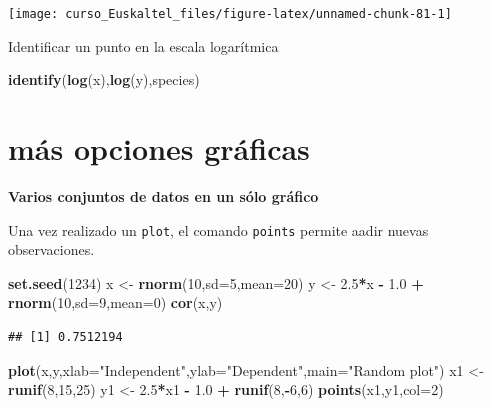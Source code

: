 \documentclass[]{book}
\newenvironment{Shaded}{\begin{snugshade}}{\end{snugshade}}
\newcommand{\KeywordTok}[1]{\textcolor[rgb]{0.13,0.29,0.53}{\textbf{#1}}}
\newcommand{\DataTypeTok}[1]{\textcolor[rgb]{0.13,0.29,0.53}{#1}}
\newcommand{\DecValTok}[1]{\textcolor[rgb]{0.00,0.00,0.81}{#1}}
\newcommand{\FloatTok}[1]{\textcolor[rgb]{0.00,0.00,0.81}{#1}}
\newcommand{\StringTok}[1]{\textcolor[rgb]{0.31,0.60,0.02}{#1}}
\newcommand{\OperatorTok}[1]{\textcolor[rgb]{0.81,0.36,0.00}{\textbf{#1}}}
\newcommand{\NormalTok}[1]{#1}
\begin{document}
\begin{center}\texttt{[image: curso\_Euskaltel\_files/figure-latex/unnamed-chunk-81-1]} \end{center}

Identificar un punto en la escala logarítmica

\begin{Shaded}
\begin{Highlighting}[]
\KeywordTok{identify}\NormalTok{(}\KeywordTok{log}\NormalTok{(x),}\KeywordTok{log}\NormalTok{(y),species)}
\end{Highlighting}
\end{Shaded}

\section{más opciones gráficas}\label{mas-opciones-graficas}

\textbf{Varios conjuntos de datos en un sólo gráfico}

Una vez realizado un \texttt{plot}, el comando \texttt{points} permite
aadir nuevas observaciones.

\begin{Shaded}
\begin{Highlighting}[]
\KeywordTok{set.seed}\NormalTok{(}\DecValTok{1234}\NormalTok{)}
\NormalTok{ x <-}\StringTok{ }\KeywordTok{rnorm}\NormalTok{(}\DecValTok{10}\NormalTok{,}\DataTypeTok{sd=}\DecValTok{5}\NormalTok{,}\DataTypeTok{mean=}\DecValTok{20}\NormalTok{)}
\NormalTok{ y <-}\StringTok{ }\FloatTok{2.5}\OperatorTok{*}\NormalTok{x }\OperatorTok{-}\StringTok{ }\FloatTok{1.0} \OperatorTok{+}\StringTok{ }\KeywordTok{rnorm}\NormalTok{(}\DecValTok{10}\NormalTok{,}\DataTypeTok{sd=}\DecValTok{9}\NormalTok{,}\DataTypeTok{mean=}\DecValTok{0}\NormalTok{)}
 \KeywordTok{cor}\NormalTok{(x,y)}
\end{Highlighting}
\end{Shaded}

\begin{verbatim}
## [1] 0.7512194
\end{verbatim}

\begin{Shaded}
\begin{Highlighting}[]
 \KeywordTok{plot}\NormalTok{(x,y,}\DataTypeTok{xlab=}\StringTok{"Independent"}\NormalTok{,}\DataTypeTok{ylab=}\StringTok{"Dependent"}\NormalTok{,}\DataTypeTok{main=}\StringTok{"Random plot"}\NormalTok{)}
\NormalTok{ x1 <-}\StringTok{ }\KeywordTok{runif}\NormalTok{(}\DecValTok{8}\NormalTok{,}\DecValTok{15}\NormalTok{,}\DecValTok{25}\NormalTok{)}
\NormalTok{ y1 <-}\StringTok{ }\FloatTok{2.5}\OperatorTok{*}\NormalTok{x1 }\OperatorTok{-}\StringTok{ }\FloatTok{1.0} \OperatorTok{+}\StringTok{ }\KeywordTok{runif}\NormalTok{(}\DecValTok{8}\NormalTok{,}\OperatorTok{-}\DecValTok{6}\NormalTok{,}\DecValTok{6}\NormalTok{)}
 \KeywordTok{points}\NormalTok{(x1,y1,}\DataTypeTok{col=}\DecValTok{2}\NormalTok{)}
\end{Highlighting}
\end{Shaded}
\end{document}
